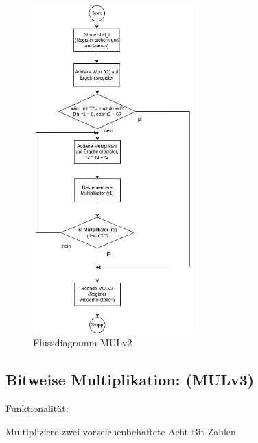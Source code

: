 \documentclass[fleqn, a4paper, 1pt]{article}       %
\begin{document}
\begin{figure}[h]
    \centering
    \includegraphics[width =0.55\textwidth]{Mulv2.png}
\caption{Flussdiagramm MULv2}
\label{fig:bitw_Mul_Prinzip}
\end{figure}

\newpage

\subsection{Bitweise Multiplikation: (MULv3)}
Funktionalität:

Multipliziere zwei vorzeichenbehaftete Acht-Bit-Zahlen
\\
\end{document}
